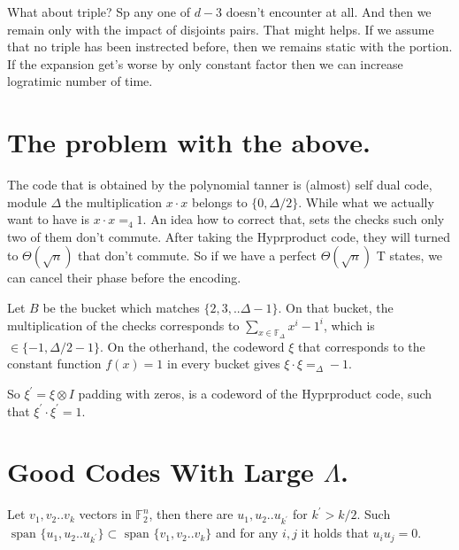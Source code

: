 \documentclass[manuscript,screen,review]{acmart}
\begin{document}
What about triple? Sp any one of $d-3$ doesn't encounter at all. And then we
remain only with the impact of disjoints pairs. That might helps. If we assume
that no triple has been instrected before, then we remains static with the
portion. If the expansion get's worse by only constant factor then we can
increase logratimic number of time.

\section{The problem with the above.}
The code that is obtained by the polynomial tanner is (almost) self dual code,
module $\Delta$ the multiplication $x \cdot x$ belongs to $\{ 0, \Delta/2 \}$.
While what we actually want to have is $x \cdot x =_{4} 1$. An idea how to
correct that, sets the checks such only two of them don't commute. After
taking the Hyprproduct code, they will turned to $\Theta(\sqrt{n})$ that don't
commute. So if we have a perfect $\Theta(\sqrt{n})$ T states, we can cancel
their phase before the encoding.

Let $B$ be the bucket which matches $\{2,3,..\Delta-1\}$. On that bucket, the
multiplication of the checks corresponds to $\sum_{x\in
\mathbb{F}_{\Delta}}x^{i} - 1^i$, which is $\in \{ -1, \Delta/2 - 1 \}$. On
the otherhand, the codeword $\xi$ that corresponds to the constant function
$f(x)= 1$ in every bucket gives $\xi \cdot \xi =_{\Delta} -1$.

So $\xi^{\prime} = \xi \otimes I$ padding with zeros, is a codeword of the
Hyprproduct code, such that $\xi^{\prime}\cdot \xi^{\prime} = 1$.

\section{Good Codes With Large $\Lambda$.}
\newcommand*{\DETAILS}{}
\ifdefined\DETAILS

\fi

\begin{claim}
  \label{claim:find}
  Let $v_{1},v_{2}..v_{k}$ vectors in $\mathbb{F}_{2}^{n}$, then there are
  $u_{1},u_{2}..u_{k^{\prime}}$ for $k^{\prime} > k/2$. Such $\text{ span } \{
  u_{1},u_{2}..u_{k^{\prime}} \} \subset \text{ span } \{ v_{1},v_{2}..v_{k} \}$
  and for any $i,j$ it holds that $u_{i}u_{j} = 0$.
\end{claim}
\end{document}
